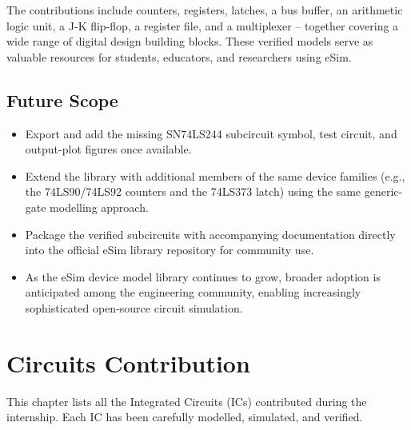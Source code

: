 \documentclass[12pt,a4paper]{report}
\begin{document}
The contributions include counters, registers, latches, a bus buffer, an
arithmetic logic unit, a J-K flip-flop, a register file, and a
multiplexer -- together covering a wide range of digital design building
blocks. These verified models serve as valuable resources for students,
educators, and researchers using eSim.

\section*{Future Scope}
\begin{itemize}
  \item Export and add the missing SN74LS244 subcircuit symbol, test
    circuit, and output-plot figures once available.
  \item Extend the library with additional members of the same device
    families (e.g., the 74LS90/74LS92 counters and the 74LS373 latch)
    using the same generic-gate modelling approach.
  \item Package the verified subcircuits with accompanying documentation
    directly into the official eSim library repository for community use.
  \item As the eSim device model library continues to grow, broader
    adoption is anticipated among the engineering community, enabling
    increasingly sophisticated open-source circuit simulation.
\end{itemize}

\chapter{Circuits Contribution}

This chapter lists all the Integrated Circuits (ICs) contributed during
the internship. Each IC has been carefully modelled, simulated, and
verified.
\end{document}

